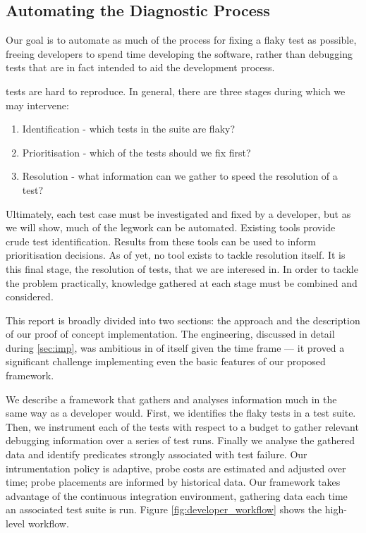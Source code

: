 \subsection{Automating the Diagnostic Process}

Our goal is to automate as much of the process for fixing a flaky test as
possible, freeing developers to spend time developing the software, rather than
debugging tests that are in fact intended to aid the development process.

\Flaky tests are hard to reproduce. In general, there are three stages during
which we may intervene:
\begin{enumerate}
	\item Identification - which tests in the suite are flaky?
	\item Prioritisation - which of the \flaky tests should we fix first?
	\item Resolution - what information can we gather to speed the resolution of a
	test?
\end{enumerate}

Ultimately, each test case must be investigated and fixed by a developer, but as
we will show, much of the legwork can be automated. Existing tools provide crude
\flaky test identification. Results from these tools can be used to inform
prioritisation decisions. As of yet, no tool exists to tackle resolution itself.
It is this final stage, the resolution of \flaky tests, that we are interesed
in. In order to tackle the problem practically, knowledge gathered at
each stage must be combined and considered.

This report is broadly divided into two sections: the approach and the
description of our proof of concept implementation. The engineering, discussed
in detail during \autoref{sec:imp}, was ambitious in of itself given the time
frame --- it proved a significant challenge implementing even the basic features
of our proposed framework.

We describe a framework that gathers and analyses information much in the same
way as a developer would. First, we identifies the flaky tests in a test suite.
Then, we instrument each of the tests with respect to a budget to gather
relevant debugging information over a series of test runs. Finally we analyse
the gathered data and identify predicates strongly associated with test failure.
Our intrumentation policy is adaptive, probe costs are estimated and adjusted
over time; probe placements are informed by historical data. Our framework takes
advantage of the continuous integration environment, gathering data each time an
associated test suite is run. Figure \ref{fig:developer_workflow} shows the
high-level workflow.

